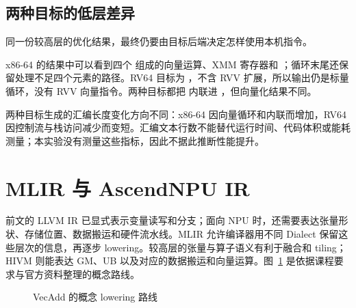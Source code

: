 \documentclass[UTF8,a4paper,11pt]{ctexart}
\newcommand{\code}[1]{\texttt{\detokenize{#1}}}
\begin{document}
\subsection{两种目标的低层差异}

同一份较高层的优化结果，最终仍要由目标后端决定怎样使用本机指令。

x86-64 的结果中可以看到四个 \code{i32} 组成的向量运算、XMM 寄存器和 \code{paddd}；循环末尾还保留处理不足四个元素的路径。RV64 目标为 \code{rv64gc}，不含 RVV 扩展，所以输出仍是标量循环，没有 RVV 向量指令。两种目标都把 \code{calc} 内联进 \code{main}，但向量化结果不同。

两种目标生成的汇编长度变化方向不同：x86-64 因向量循环和内联而增加，RV64 因控制流与栈访问减少而变短。汇编文本行数不能替代运行时间、代码体积或能耗测量；本实验没有测量这些指标，因此不据此推断性能提升。

\section{MLIR 与 AscendNPU IR}

前文的 LLVM IR 已显式表示变量读写和分支；面向 NPU 时，还需要表达张量形状、存储位置、数据搬运和硬件流水线。MLIR 允许编译器用不同 Dialect 保留这些层次的信息，再逐步 lowering。较高层的张量与算子语义有利于融合和 tiling；HIVM 则能表达 GM、UB 以及对应的数据搬运和向量运算。图~\ref{fig:lowering} 是依据课程要求与官方资料整理的概念路线。\cite{mlir-lang,mlir-rationale,ascend-framework}

\begin{figure}[H]
  \centering
  \caption{VecAdd 的概念 lowering 路线}
  \label{fig:lowering}
\end{figure}
\end{document}
